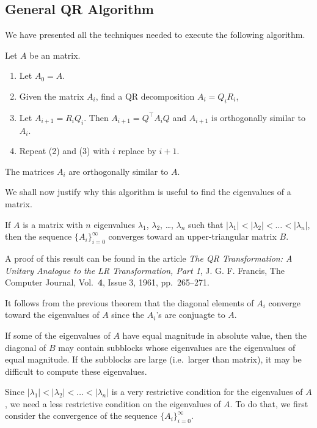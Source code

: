 \subsection{General QR Algorithm}

We have presented all the techniques needed to execute the following
algorithm.

\begin{algo}[QR Algorithm]
Let $A$ be an \nn matrix.
\begin{enumerate}
\item Let $A_0 = A$.
\item Given the \nn matrix $A_i$, find a QR decomposition $A_i = Q_i R_i$,
\item Let $A_{i+1} = R_i Q_i$.  Then $A_{i+1} = Q^\top A_i Q$ and
$A_{i+1}$ is orthogonally similar to $A_i$.
\item Repeat (2) and (3) with $i$ replace by $i+1$.
\end{enumerate}
The matrices $A_i$ are orthogonally similar to $A$.
\end{algo}

We shall now justify why this algorithm is useful to find the
eigenvalues of a matrix.

\begin{theorem}[Francis]
If $A$ is a \nn matrix with $n$ eigenvalues $\lambda_1$, $\lambda_2$,
\ldots, $\lambda_n$ such that $|\lambda_1|<|\lambda_2|<\ldots <|\lambda_n|$,
then the sequence $\displaystyle \{ A_i\}_{i=0}^\infty$ converges
toward an upper-triangular matrix $B$.
\end{theorem}

A proof of this result can be found in the article
{\it The QR Transformation: A Unitary Analogue to the LR
  Transformation, Part 1}, J. G. F. Francis, The Computer Journal,
Vol.\ {\bfseries 4}, Issue 3, 1961, pp.\ 265–271.

It follows from the previous theorem that the diagonal elements of
$A_i$ converge toward the eigenvalues of $A$ since the $A_i$'s are
conjuagte to $A$.

If some of the eigenvalues of $A$ have equal magnitude in absolute value,
then the diagonal of $B$ may contain subblocks whose eigenvalues are
the eigenvalues of equal magnitude.   If the subblocks are large
(i.e.\ larger than  matrix), it may be difficult to compute
these eigenvalues.

Since $|\lambda_1|<|\lambda_2|<\ldots <|\lambda_n|$ is a very
restrictive condition for the eigenvalues of $A$, we need a less
restrictive condition on the eigenvalues of $A$.  To do that, we first
consider the convergence of the sequence
$\displaystyle \{ A_i\}_{i=0}^\infty$.

